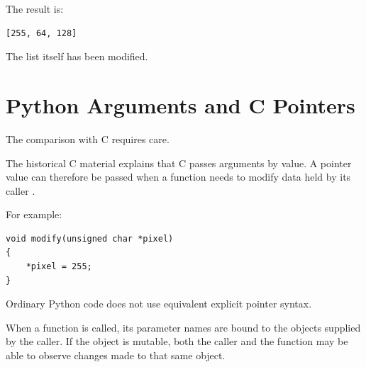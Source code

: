 The result is:

\begin{verbatim}
[255, 64, 128]
\end{verbatim}

The list itself has been modified.


\section{Python Arguments and C Pointers}
\label{sec:python-c-pointers}

The comparison with C requires care.

The historical C material explains that C passes arguments by value.
A pointer value can therefore be passed when a function needs to
modify data held by its caller
\cite{johnson_uqc146_c2}.

For example:

\begin{verbatim}
void modify(unsigned char *pixel)
{
    *pixel = 255;
}
\end{verbatim}

Ordinary Python code does not use equivalent explicit pointer syntax.

When a function is called, its parameter names are bound to the
objects supplied by the caller. If the object is mutable, both the
caller and the function may be able to observe changes made to that
same object.

